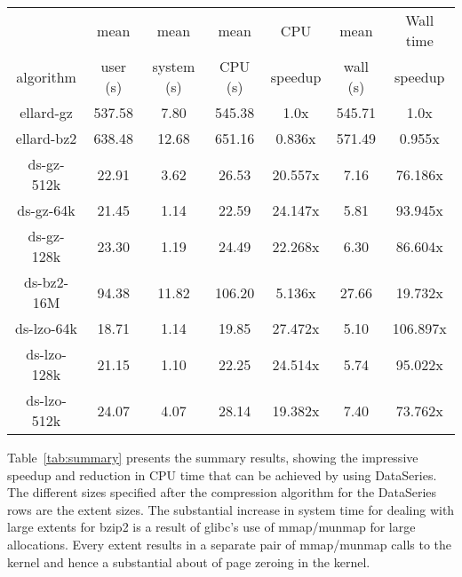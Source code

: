 \documentclass{acm_proc_article-sp}
\begin{document}
\begin{table*}
\centering
\begin{tabular}{|c|c|c|c|c|c|c|} \hline
            & mean     & mean       & mean     & CPU     & mean     & Wall time \\
algorithm   & user (s) & system (s) & CPU (s)  & speedup & wall (s) & speedup  \\ \hline
ellard-gz   & 537.58    &  7.80     & 545.38   &  1.0x   & 545.71   &   1.0x   \\
ellard-bz2  & 638.48    & 12.68     & 651.16   &  0.836x & 571.49   &   0.955x \\
\hline
ds-gz-512k  &  22.91    &  3.62     &  26.53   & 20.557x &   7.16   &  76.186x \\
ds-gz-64k   &  21.45    &  1.14     &  22.59   & 24.147x &   5.81   &  93.945x \\
ds-gz-128k  &  23.30    &  1.19     &  24.49   & 22.268x &   6.30   &  86.604x \\
\hline
ds-bz2-16M  &  94.38    & 11.82     & 106.20   &  5.136x &  27.66   &  19.732x \\
ds-lzo-64k  &  18.71    &  1.14     &  19.85   & 27.472x &   5.10   & 106.897x \\
ds-lzo-128k &  21.15    &  1.10     &  22.25   & 24.514x &   5.74   &  95.022x \\
ds-lzo-512k &  24.07    &  4.07     &  28.14   & 19.382x &   7.40   &  73.762x \\ \hline
\end{tabular}

\caption{
Summary of performance results for the two analysis programs
operating on a variety of input files.  The analysis was run over the
anon-home04-011118-* files.  For the ellard {\tt nfsscan} program
the text files were compressed with either gz or bz2.  For the
DataSeries {\tt ellardanalysis} program, the DataSeries files were
compressed with either gz, bz2, or lzo, and used various extent sizes
as specified.  CPU and wall time are both relative to ellard-gz.
}

\label{tab:summary}
\end{table*}


Table~\ref{tab:summary} presents the summary results, showing the
impressive speedup and reduction in CPU time that can be achieved by
using DataSeries.  The different sizes specified after the compression
algorithm for the DataSeries rows are the extent sizes. 
The substantial increase in system time for dealing
with large extents for bzip2 is a result of glibc's use of mmap/munmap
for large allocations.  Every extent results in a separate pair of
mmap/munmap calls to the kernel and hence a substantial about of page
zeroing in the kernel.  
\end{document}
